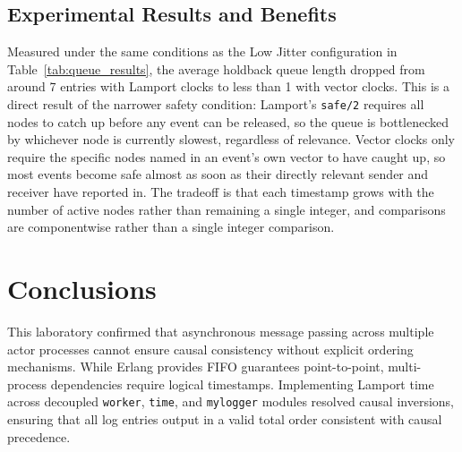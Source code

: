 \documentclass[a4paper, 11pt]{article}
\begin{document}
\subsection{Experimental Results and Benefits}
Measured under the same conditions as the Low Jitter configuration in Table~\ref{tab:queue_results}, the average holdback queue length dropped from around 7 entries with Lamport clocks to less than 1 with vector clocks. This is a direct result of the narrower safety condition: Lamport's \texttt{safe/2} requires all nodes to catch up before any event can be released, so the queue is bottlenecked by whichever node is currently slowest, regardless of relevance. Vector clocks only require the specific nodes named in an event's own vector to have caught up, so most events become safe almost as soon as their directly relevant sender and receiver have reported in. The tradeoff is that each timestamp grows with the number of active nodes rather than remaining a single integer, and comparisons are componentwise rather than a single integer comparison.

\section{Conclusions}

This laboratory confirmed that asynchronous message passing across multiple actor processes cannot ensure causal consistency without explicit ordering mechanisms. While Erlang provides FIFO guarantees point-to-point, multi-process dependencies require logical timestamps. Implementing Lamport time across decoupled \texttt{worker}, \texttt{time}, and \texttt{mylogger} modules resolved causal inversions, ensuring that all log entries output in a valid total order consistent with causal precedence.
\end{document}
